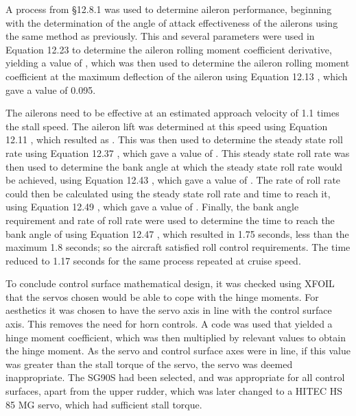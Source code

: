 \documentclass[../../main.tex]{subfiles}
\begin{document}
A process from \S 12.8.1 \cite{sadraey-13} was used to determine aileron performance, beginning with the determination of the angle of attack effectiveness of the ailerons using the same method as previously.
This and several parameters were used in Equation 12.23 \cite{sadraey-13} to determine the aileron rolling moment coefficient derivative, yielding a value of , which was then used to determine the aileron rolling moment coefficient at the maximum deflection of the aileron using Equation 12.13 \cite{sadraey-13}, which gave a value of 0.095. 

The ailerons need to be effective at an estimated approach velocity of 1.1 times the stall speed.
The aileron lift was determined at this speed using Equation 12.11 \cite{sadraey-13}, which resulted as .
This was then used to determine the steady state roll rate using Equation 12.37 \cite{sadraey-13}, which gave a value of .
This steady state roll rate was then used to determine the bank angle at which the steady state roll rate would be achieved, using Equation 12.43 \cite{sadraey-13}, which gave a value of .
The rate of roll rate could then be calculated using the steady state roll rate and time to reach it, using Equation 12.49 \cite{sadraey-13}, which gave a value of .
Finally, the   bank angle requirement and rate of roll rate were used to determine the time to reach the bank angle of  using Equation 12.47 \cite{sadraey-13}, which resulted in 1.75 seconds, less than the maximum 1.8 seconds; so the aircraft satisfied roll control requirements.
The time reduced to 1.17 seconds for the same process repeated at cruise speed. 

To conclude control surface mathematical design, it was checked using XFOIL that the servos chosen would be able to cope with the hinge moments.
For aesthetics it was chosen to have the servo axis in line with the control surface axis.
This removes the need for horn controls.
A code was used that yielded a hinge moment coefficient, which was then multiplied by relevant values to obtain the hinge moment.
As the servo and control surface axes were in line, if this value was greater than the stall torque of the servo, the servo was deemed inappropriate.
The SG90S had been selected, and was appropriate for all control surfaces, apart from the upper rudder, which was later changed to a HITEC HS 85 MG servo, which had sufficient stall torque. 

\end{document}
